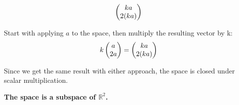 \documentclass{article}
\begin{document}
{{	\[
	\left(\begin{array}{@{}c@{}}
		ka \\
		2(ka) \\ 
	\end{array}\right)
	\]
	\par\noindent Start with applying \(a\) to the space, then multiply the resulting vector by k:
	\[
	k	\left(\begin{array}{@{}c@{}}
		a \\
		2a \\ 
	\end{array}\right) = 
	\left(\begin{array}{@{}c@{}}
	ka \\
	2(ka) \\ 
\end{array}\right)
	\]
	\par\noindent Since we get the same result with either approach, the space is closed under scalar multiplication.
	\newline
	\par\noindent \textbf{The space is a subspace of \(\mathbb{R}^2\).}
}
}
\newline
\newline
\newline
{}
\newline
\newline
\newline
\end{document}
